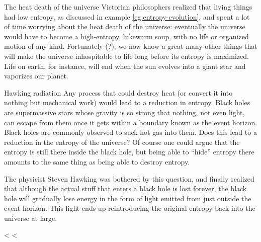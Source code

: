 \begin{eg}{The heat death of the universe}
Victorian philosophers realized that living things had low
entropy, as discussed in example \ref{eg:entropy-evolution}, and spent a lot of time worrying about
the heat death of the universe: eventually the universe
would have to become a high-entropy, lukewarm soup, with no
life or organized motion of any kind. Fortunately (?), we
now know a great many other things that will make the
universe inhospitable to life long before its entropy is
maximized. Life on earth, for instance, will end when the
sun evolves into a giant star and vaporizes our planet.
\end{eg}

\begin{eg}{Hawking radiation}
Any process that could destroy heat (or convert it into
nothing but mechanical work) would lead to a reduction in
entropy. Black holes are supermassive stars whose gravity is
so strong that nothing, not even light, can escape from them
once it gets within a boundary known as the event horizon.
Black holes are commonly observed to suck hot gas into them.
Does this lead to a reduction in the entropy of the
universe? Of course one could argue that the entropy is
still there inside the black hole, but being able to
``hide'' entropy there amounts to the same thing as being
able to destroy entropy.

The physicist Steven Hawking was bothered by this question,
and finally realized that although the actual stuff that
enters a black hole is lost forever, the black hole will
gradually lose energy  in the form of light emitted from
just outside the event horizon. This light ends up
reintroducing the original entropy back into the universe at
large.
\end{eg}



<%
<%

